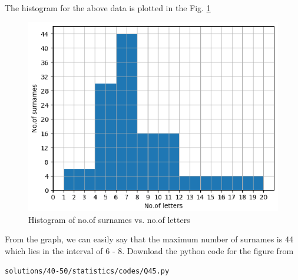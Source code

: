  The histogram for the above data is plotted in the Fig. \ref{fig:stats_exer_45}

\begin{figure}[!ht]
\centering
\includegraphics[width= \columnwidth]{./solutions/40-50/statistics/figs/Q45.eps}
\caption{Histogram of no.of surnames vs. no.of letters}
\label{fig:stats_exer_45}
\end{figure}

 From the graph, we can easily say that the maximum number of surnames is 44 which lies in the interval of 6 - 8.
 Download the python code for the figure from 
\begin{lstlisting}
solutions/40-50/statistics/codes/Q45.py
\end{lstlisting}

